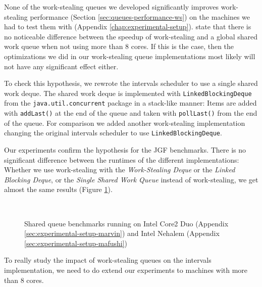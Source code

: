 None of the work-stealing queues we developed significantly improves
work-stealing performance (Section \ref{sec:queues-performance-ws}) on
the machines we had to test them with (Appendix
\ref{chap:experimental-setup}). \textcite{Saha2007} state that there
is no noticeable difference between the speedup of work-stealing and a
global shared work queue when not using more than 8 cores. If this is
the case, then the optimizations we did in our work-stealing queue
implementations most likely will not have any significant effect
either.

To check this hypothesis, we rewrote the intervals scheduler to use a
single shared work deque. The shared work deque is implemented with
\lstinline!LinkedBlockingDeque! from the
\lstinline!java.util.concurrent! package in a stack-like manner: Items
are added with \lstinline!addLast()! at the end of the queue and taken
with \lstinline!pollLast()! from the end of the queue. For comparison
we added another work-stealing implementation changing the original
intervals scheduler to use \lstinline!LinkedBlockingDeque!.

Our experiments confirm the hypothesis for the JGF benchmarks. There
is no significant difference between the runtimes of the different
implementations: Whether we use work-stealing with the
\emph{Work-Stealing Deque} or the \emph{Linked Blocking Deque}, or the
\emph{Single Shared Work Queue} instead of work-stealing, we get
almost the same results (Figure
\ref{fig:queues-performance-shared-queue}).

\begin{figure}[!ht]
  \centering
  \\
  \caption[Shared queue benchmarks]{Shared queue benchmarks running on
    Intel Core2 Duo (Appendix \ref{sec:experimental-setup-marvin}) and
    Intel Nehalem (Appendix \ref{sec:experimental-setup-mafushi})}
  \label{fig:queues-performance-shared-queue}
\end{figure}

To really study the impact of work-stealing queues on the intervals
implementation, we need to do extend our experiments to machines with
more than 8 cores.


